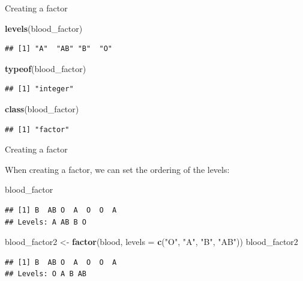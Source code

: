 \documentclass[ignorenonframetext,]{beamer}
\newenvironment{Shaded}{\begin{snugshade}}{\end{snugshade}}
\newcommand{\DataTypeTok}[1]{\textcolor[rgb]{0.13,0.29,0.53}{#1}}
\newcommand{\KeywordTok}[1]{\textcolor[rgb]{0.13,0.29,0.53}{\textbf{#1}}}
\newcommand{\NormalTok}[1]{#1}
\newcommand{\StringTok}[1]{\textcolor[rgb]{0.31,0.60,0.02}{#1}}
\begin{document}
\begin{frame}[fragile]{Creating a factor}
\protect\hypertarget{creating-a-factor-2}{}

\begin{Shaded}
\begin{Highlighting}[]
\KeywordTok{levels}\NormalTok{(blood_factor)}
\end{Highlighting}
\end{Shaded}

\begin{verbatim}
## [1] "A"  "AB" "B"  "O"
\end{verbatim}

\begin{Shaded}
\begin{Highlighting}[]
\KeywordTok{typeof}\NormalTok{(blood_factor)}
\end{Highlighting}
\end{Shaded}

\begin{verbatim}
## [1] "integer"
\end{verbatim}

\begin{Shaded}
\begin{Highlighting}[]
\KeywordTok{class}\NormalTok{(blood_factor)}
\end{Highlighting}
\end{Shaded}

\begin{verbatim}
## [1] "factor"
\end{verbatim}

\end{frame}

\begin{frame}[fragile]{Creating a factor}
\protect\hypertarget{creating-a-factor-3}{}

When creating a factor, we can set the ordering of the levels:

\begin{Shaded}
\begin{Highlighting}[]
\NormalTok{blood_factor}
\end{Highlighting}
\end{Shaded}

\begin{verbatim}
## [1] B  AB O  A  O  O  A 
## Levels: A AB B O
\end{verbatim}

\begin{Shaded}
\begin{Highlighting}[]
\NormalTok{blood_factor2 <-}\StringTok{ }\KeywordTok{factor}\NormalTok{(blood,}
                    \DataTypeTok{levels =} \KeywordTok{c}\NormalTok{(}\StringTok{"O"}\NormalTok{, }\StringTok{"A"}\NormalTok{, }\StringTok{"B"}\NormalTok{, }\StringTok{"AB"}\NormalTok{))}
\NormalTok{blood_factor2}
\end{Highlighting}
\end{Shaded}

\begin{verbatim}
## [1] B  AB O  A  O  O  A 
## Levels: O A B AB
\end{verbatim}

\end{frame}
\end{document}
